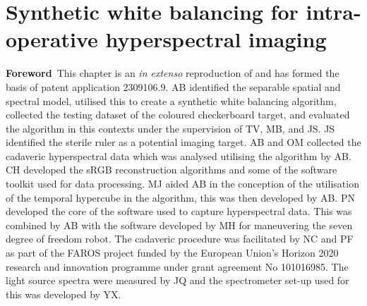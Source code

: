 % 
\chapter[Synthetic white balancing]{Synthetic white balancing for intra-operative hyperspectral imaging}
\label{chap:SWB}

\begin{center}
\begin{minipage}[b]{0.9\linewidth}
\small
\textbf{Foreword\,}
This chapter is an \emph{in extenso} reproduction of \citet{Bahl2023} and has formed the basis of patent application 2309106.9. 
\newline
AB identified the separable spatial and spectral model, utilised this to create a synthetic white balancing algorithm, collected the testing dataset of the coloured checkerboard target, and evaluated the algorithm in this contexts under the supervision of TV, MB, and JS. JS identified the sterile ruler as a potential imaging target. AB and OM collected the cadaveric hyperspectral data which was analysed utilising the algorithm by AB. CH developed the sRGB reconstruction algorithms and some of the software toolkit used for data processing. MJ aided AB in the conception of the utilisation of the temporal hypercube in the algorithm, this was then developed by AB. PN developed the core of the software used to capture hyperspectral data. This was combined by AB with the software developed by MH for maneuvering the seven degree of freedom robot. The cadaveric procedure was facilitated by NC and PF as part of the FAROS project funded by the European Union’s Horizon 2020 research and innovation programme under grant agreement No 101016985. The light source spectra were measured by JQ and the spectrometer set-up used for this was developed by YX. 
\end{minipage}
\end{center}

\minitoc



